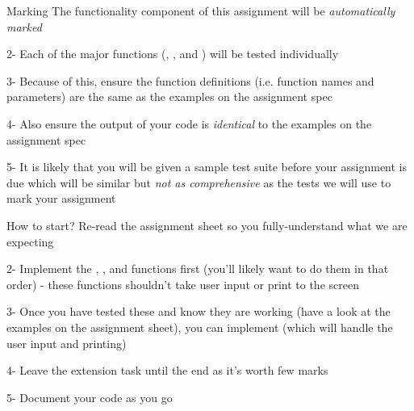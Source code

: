 \documentclass[week3]{csse1001}
\begin{document}
\begin{topic}{Marking}
The functionality component of this assignment will be \textit{automatically marked}

\begin{subtopic}{2-}
Each of the major functions (, ,  and ) will be tested individually
\end{subtopic}

\begin{subtopic}{3-}
Because of this, ensure the function definitions (i.e. function names and parameters) are the same as the examples on the assignment spec
\end{subtopic}

\begin{subtopic}{4-}
Also ensure the output of your code is \textit{identical} to the examples on the assignment spec
\end{subtopic}

\begin{subtopic}{5-}
It is likely that you will be given a sample test suite before your assignment is due which will be similar but \textit{not as comprehensive} as the tests we will use to mark your assignment
\end{subtopic}

\end{topic}

\begin{topic}{How to start?}
Re-read the assignment sheet so you fully-understand what we are expecting

\begin{subtopic}{2-}
Implement the , , and  functions first (you'll likely want to do them in that order) - these functions shouldn't take user input or print to the screen
\end{subtopic}

\begin{subtopic}{3-}
Once you have tested these and know they are working (have a look at the examples on the assignment sheet), you can implement  (which will handle the user input and printing)
\end{subtopic}

\begin{subtopic}{4-}
Leave the extension task until the end as it's worth few marks
\end{subtopic}

\begin{subtopic}{5-}
Document your code as you go
\end{subtopic}

\end{topic}
\end{document}
